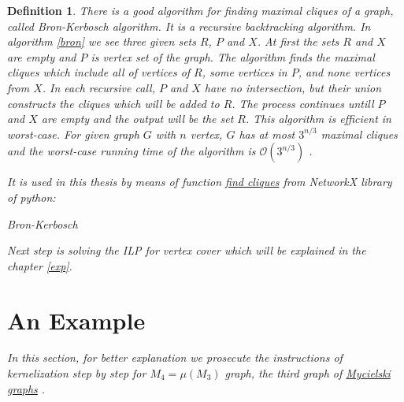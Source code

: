\documentclass[12pt]{article}
\theoremstyle{slplain}
\newtheorem{defi}{Definition}[section]
\begin{document}
\begin{defi}
There is a good algorithm for finding maximal cliques of a graph, called Bron-Kerbosch\cite{bron} algorithm. It is a recursive  backtracking algorithm. In algorithm \ref{bron} we see three given sets $R$, $P$ and $X$. At first the sets $R$ and $X$ are empty and $P$ is vertex set of the graph. The algorithm finds the maximal cliques which include all of vertices of $R$, some vertices in $P$, and none vertices from $X$. In each recursive call, $P$ and $X$ have no intersection, but their union constructs the cliques which will be added to $R$. The process continues untill $P$ and $X$ are empty and the output will be the set $R$. This algorithm is efficient in worst-case. For given graph $G$ with $n$ vertex, $G$ has at most $3^{n/3}$ maximal cliques and the worst-case running time of the algorithm is $\mathcal{O}(3^{n/3})$ \cite{moon}. 


It is used in this thesis by means of function \href{https://networkx.github.io/documentation/networkx-1.10/reference/generated/networkx.algorithms.clique.find_cliques.html}{find cliques} from NetworkX library of python:

\vspace{1cm}

\begin{algorithm}\label{bron}
\begin{algorithmic}

\EndFunction
\end{algorithmic}
\caption{Bron-Kerbosch}
\end{algorithm}

\vspace{1cm}

Next step is solving the ILP for vertex cover which will be explained in the chapter \ref{exp}.

\newpage


\section{An Example}{\label{section}}
In this section, for better explanation we prosecute the instructions of kernelization 
step by step for $M_4 = \mu(M_3)$ graph, the third graph of \href{https://en.wikipedia.org/wiki/Mycielskian}{Mycielski graphs} \cite{mycielski}.


\end{defi}
\end{document}
